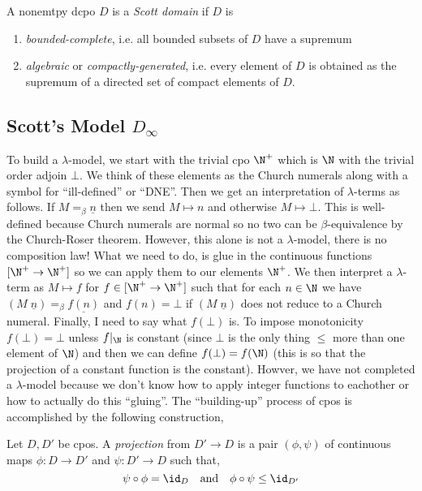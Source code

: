 \documentclass[12pt]{article}
\begin{document}
\begin{defn}
A nonemtpy dcpo $D$ is a \textit{Scott domain} if $D$ is 
\begin{enumerate}
\item \textit{bounded-complete}, i.e. all bounded subsets of $D$ have a supremum
\item \textit{algebraic} or \textit{compactly-generated}, i.e. every element of $D$ is obtained as the supremum of a directed set of compact elements of $D$.
\end{enumerate}
\end{defn}

\subsection{Scott's Model $D_{\infty}$}

To build a $\lambda$-model, we start with the trivial cpo $\N^+$ which is $\N$ with the trivial order adjoin $\bot$. We think of these elements as the Church numerals along with a symbol for ``ill-defined'' or ``DNE''. Then we get an interpretation of $\lambda$-terms as follows. If $M =_\beta \underline{n}$ then we send $M \mapsto n$ and otherwise $M \mapsto \bot$. This is well-defined because Church numerals are normal so no two can be $\beta$-equivalence by the Church-Roser theorem. However, this alone is not a $\lambda$-model, there is no composition law! What we need to do, is glue in the continuous functions $[\N^+ \to \N^+]$ so we can apply them to our elements $\N^+$. We then interpret a $\lambda$-term as $M \mapsto f$ for $f \in [\N^+ \to \N^+]$ such that for each $n \in \N$ we have $(M \; \underline{n}) =_\beta \underline{f(n)}$ and $f(n) = \bot$ if $(M \; \underline{n})$ does not reduce to a Church numeral. Finally, I need to say what $f(\bot)$ is. To impose monotonicity
 $f(\bot) = \bot$ unless $f|_{\N}$ is constant (since $\bot$ is the only thing $\le$ more than one element of $\N$) and then we can define $f(\bot) = f(\N)$ (this is so that the projection of a constant function is the constant). Howver, we have not completed a $\lambda$-model because we don't know how to apply integer functions to eachother or how to actually do this ``gluing''. The ``building-up'' process of cpos is accomplished by the following construction,

\begin{defn}
Let $D, D'$ be cpos. A \textit{projection} from $D' \to D$ is a pair $(\phi, \psi)$ of continuous maps $\phi : D \to D'$ and $\psi : D' \to D$ such that,
\[ \psi \circ \phi = \id_D \quad \text{and} \quad \phi \circ \psi \le \id_{D'} \]
\end{defn}
\end{document}
